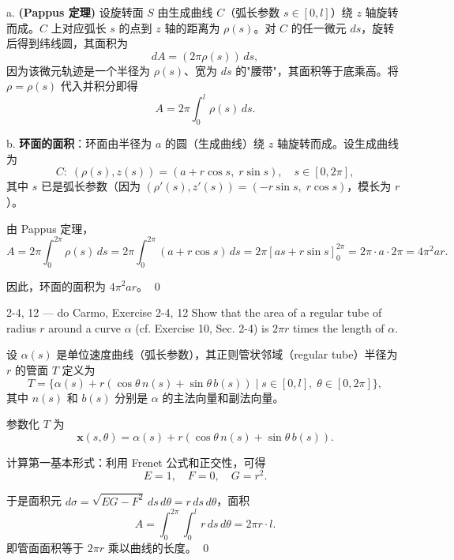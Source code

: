\begin{solution}
a. \textbf{(Pappus 定理)} 设旋转面 $S$ 由生成曲线 $C$（弧长参数 $s \in [0,l]$）绕 $z$ 轴旋转而成。$C$ 上对应弧长 $s$ 的点到 $z$ 轴的距离为 $\rho(s)$。对 $C$ 的任一微元 $ds$，旋转后得到纬线圆，其面积为
\[
dA = (2\pi\rho(s))\, ds,
\]
因为该微元轨迹是一个半径为 $\rho(s)$、宽为 $ds$ 的"腰带"，其面积等于底乘高。将 $\rho = \rho(s)$ 代入并积分即得
\[
A = 2\pi \int_0^l \rho(s)\, ds.
\]

b. \textbf{环面的面积}：环面由半径为 $a$ 的圆（生成曲线）绕 $z$ 轴旋转而成。设生成曲线为
\[
C: \; (\rho(s), z(s)) = (a + r\cos s,\; r\sin s),\quad s \in [0, 2\pi],
\]
其中 $s$ 已是弧长参数（因为 $(\rho'(s), z'(s)) = (-r\sin s,\; r\cos s)$，模长为 $r$）。

由 Pappus 定理，
\[
A = 2\pi \int_0^{2\pi} \rho(s)\, ds = 2\pi \int_0^{2\pi} (a + r\cos s)\, ds = 2\pi [as + r\sin s]_0^{2\pi} = 2\pi \cdot a \cdot 2\pi = 4\pi^2 ar.
\]

因此，环面的面积为 $4\pi^2 ar$。
\qed
\end{solution}

\begin{exercise}{2-4, 12 — do Carmo, Exercise 2-4, 12}
Show that the area of a regular tube of radius $r$ around a curve $\alpha$ (cf. Exercise 10, Sec. 2-4) is $2\pi r$ times the length of $\alpha$.
\end{exercise}

\begin{solution}
设 $\alpha(s)$ 是单位速度曲线（弧长参数），其正则管状邻域（regular tube）半径为 $r$ 的管面 $T$ 定义为
\[
T = \{\alpha(s) + r(\cos\theta\, n(s) + \sin\theta\, b(s)) \;|\; s \in [0,l],\; \theta \in [0,2\pi]\},
\]
其中 $n(s)$ 和 $b(s)$ 分别是 $\alpha$ 的主法向量和副法向量。

参数化 $T$ 为
\[
\mathbf{x}(s, \theta) = \alpha(s) + r(\cos\theta\, n(s) + \sin\theta\, b(s)).
\]

计算第一基本形式：利用 Frenet 公式和正交性，可得
\[
E = 1,\quad F = 0,\quad G = r^2.
\]

于是面积元 $d\sigma = \sqrt{EG - F^2}\, ds\, d\theta = r\, ds\, d\theta$，面积
\[
A = \int_0^{2\pi} \int_0^l r\, ds\, d\theta = 2\pi r \cdot l.
\]
即管面面积等于 $2\pi r$ 乘以曲线的长度。
\qed
\end{solution}

